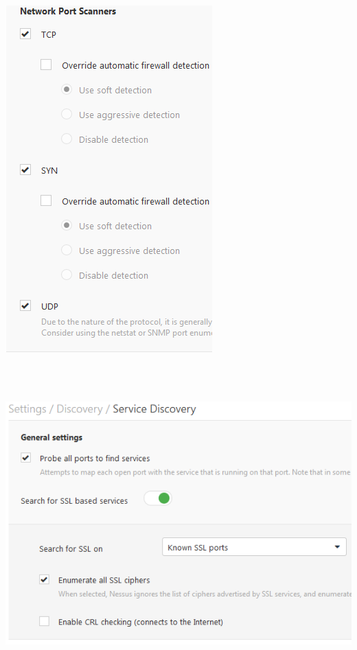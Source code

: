 \documentclass[11pt, a4paper]{article}
\begin{document}
$\;$ \\ \\
\noindent\begin{minipage}{\textwidth}
    \centering
    \includegraphics{Nessus_7.png}
\end{minipage}
$\;$ \\ \\
\noindent\begin{minipage}{\textwidth}
    \centering
    \includegraphics[width=\textwidth]{Nessus_8.png}
\end{minipage}
\end{document}
